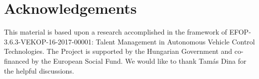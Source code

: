 \section*{Acknowledgements}

This material is based upon a research accomplished in the framework of
EFOP-3.6.3-VEKOP-16-2017-00001: Talent Management in Autonomous Vehicle Control
Technologies. The Project is supported by the Hungarian Government and
co-financed by the European Social Fund. We would like to thank Tamás Dina for
the helpful discussions.
